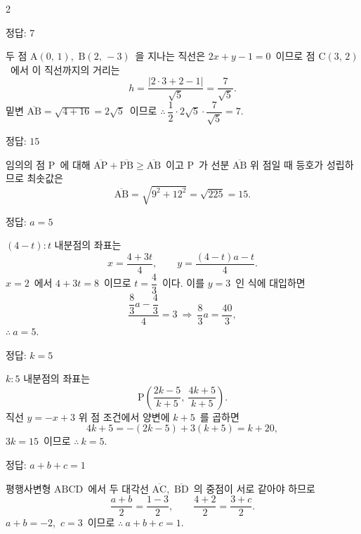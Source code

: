\documentclass[10pt,fleqn]{article}   %
\begin{document}
\begin{multicols*}{2}
\begin{dmanswerbox}
정답: $7$
\end{dmanswerbox}

두 점 $\mathrm{A}(0,\,1)$,\ $\mathrm{B}(2,\,-3)$\ 을 지나는 직선은 $2x+y-1=0$\ 이므로 점 $\mathrm{C}(3,\,2)$\ 에서 이 직선까지의 거리는
\[ h = \dfrac{|2\cdot 3 + 2 - 1|}{\sqrt{5}} = \dfrac{7}{\sqrt{5}}. \]
밑변 $\overline{\mathrm{AB}}=\sqrt{4+16}=2\sqrt{5}$\ 이므로 $\therefore\ \dfrac{1}{2}\cdot 2\sqrt{5}\cdot\dfrac{7}{\sqrt{5}} = 7$.

\begin{dmanswerbox}
정답: $15$
\end{dmanswerbox}

임의의 점 $\mathrm{P}$\ 에 대해 $\overline{\mathrm{AP}}+\overline{\mathrm{PB}}\ge\overline{\mathrm{AB}}$\ 이고 $\mathrm{P}$\ 가 선분 $\overline{\mathrm{AB}}$ 위 점일 때 등호가 성립하므로 최솟값은
\[ \overline{\mathrm{AB}} = \sqrt{9^2+12^2} = \sqrt{225} = 15. \]

\begin{dmanswerbox}
정답: $a=5$
\end{dmanswerbox}

$(4-t):t$ 내분점의 좌표는
$$x = \dfrac{4+3t}{4},\qquad y = \dfrac{(4-t)a - t}{4}.$$
$x=2$\ 에서 $4+3t=8$\ 이므로 $t=\dfrac{4}{3}$\ 이다. 이를 $y=3$\ 인 식에 대입하면
\[ \dfrac{\dfrac{8}{3}a - \dfrac{4}{3}}{4} = 3\ \Longrightarrow\ \dfrac{8}{3}a = \dfrac{40}{3}, \]
$\therefore\ a = 5$.

\begin{dmanswerbox}
정답: $k=5$
\end{dmanswerbox}

$k : 5$ 내분점의 좌표는
\[ \mathrm{P}\!\left( \dfrac{2k-5}{k+5},\ \dfrac{4k+5}{k+5} \right). \]
직선 $y = -x + 3$ 위 점 조건에서 양변에 $k+5$\ 를 곱하면
\[ 4k+5 = -(2k-5)+3(k+5) = k+20, \]
$3k = 15$\ 이므로 $\therefore\ k = 5$.

\begin{dmanswerbox}
정답: $a+b+c=1$
\end{dmanswerbox}

평행사변형 $\mathrm{ABCD}$\ 에서 두 대각선 $\overline{\mathrm{AC}}$,\ $\overline{\mathrm{BD}}$\ 의 중점이 서로 같아야 하므로
$$\dfrac{a+b}{2} = \dfrac{1-3}{2},\qquad \dfrac{4+2}{2} = \dfrac{3+c}{2}.$$
$a+b=-2$,\ $c=3$\ 이므로 $\therefore\ a+b+c = 1$.


\end{multicols*}
\end{document}

